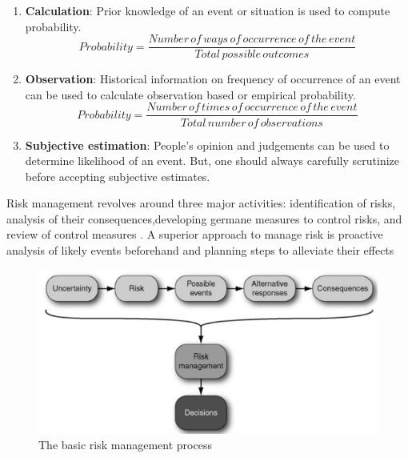 \documentclass[paper=letter, fontsize=12pt]{article}
\begin{document}
\begin{enumerate}
    \item \textbf{Calculation}: Prior knowledge of an event or situation is used to compute probability. 
    \begin{equation}
        Probability = \frac{Number\, of\, ways\, of\, occurrence\, of\, the\, event}{Total\, possible\, outcomes}
    \end{equation}
    \item \textbf{Observation}: Historical information on frequency of occurrence of an event can be used to calculate observation based or empirical probability.
    \begin{equation}
        Probability = \frac{Number\, of\, times\, of\, occurrence\, of\, the\, event}{Total\, number\, of \, observations}
    \end{equation}
    \item \textbf{Subjective estimation}: People's opinion and judgements can be used to determine likelihood of an event. But, one should always carefully scrutinize before accepting subjective estimates.
\end{enumerate}

Risk management revolves around three major activities: identification of risks, analysis of their consequences,developing germane measures to control risks, and review of control measures \cite{waters} \cite{aus}. A superior approach to manage risk is proactive analysis of likely events beforehand and planning steps to alleviate their effects \cite{waters}


 \begin{figure}[htpb]
    \centering
    \includegraphics[scale = 0.4]{risk1}
    \caption{The basic risk management process}
    \label{risk_management}
\end{figure}
\end{document}
